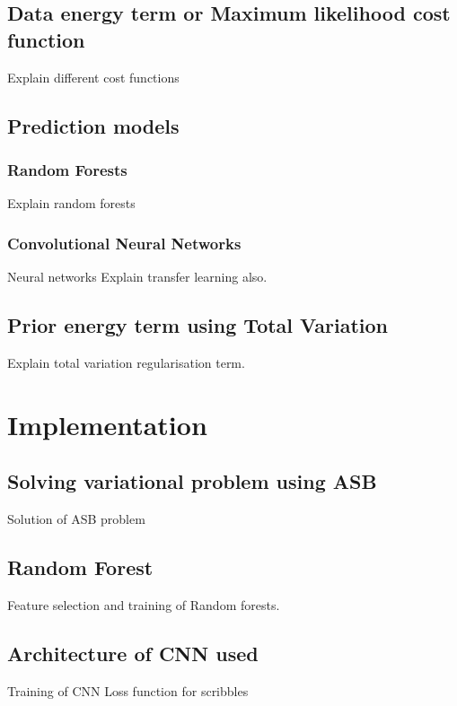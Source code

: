 \section{Data energy term or Maximum likelihood cost function}
Explain different cost functions

\section{Prediction models}
\subsection{Random Forests}
Explain random forests
\subsection{Convolutional Neural Networks}
Neural networks \newline
Explain transfer learning also.

\section{Prior energy term using Total Variation}
Explain total variation regularisation term.


\chapter{Implementation}
\section{Solving variational problem using ASB}
Solution of ASB problem
\section{Random Forest}
Feature selection and training of Random forests.
\section{Architecture of CNN used}
Training of CNN \newline
Loss function for scribbles

